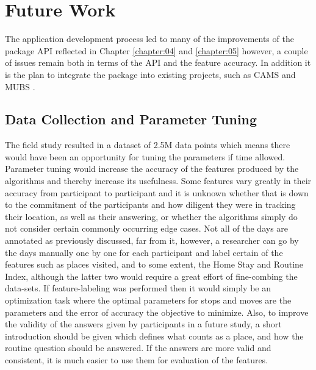 \clearpage
\section{Future Work}
The application development process led to many of the improvements of the package API reflected in Chapter \ref{chapter:04} and \ref{chapter:05} however, a couple of issues remain both in terms of the API and the feature accuracy. In addition it is the plan to integrate the package into existing projects, such as CAMS \cite{CAMS} and MUBS \cite{mubs-rohani}.

\subsection{Data Collection and Parameter Tuning}
The field study resulted in a dataset of 2.5M data points which means there would have been an opportunity for tuning the parameters if time allowed. Parameter tuning would increase the accuracy of the features produced by the algorithms and thereby increase its usefulness. Some features vary greatly in their accuracy from participant to participant and it is unknown whether that is down to the commitment of the participants and how diligent they were in tracking their location, as well as their answering, or whether the algorithms simply do not consider certain commonly occurring edge cases. Not all of the days are annotated as previously discussed, far from it, however, a researcher can go by the days manually one by one for each participant and label certain of the features such as places visited, and to some extent, the Home Stay and Routine Index, although the latter two would require a great effort of fine-combing the data-sets. If feature-labeling was performed then it would simply be an optimization task where the optimal parameters for stops and moves are the parameters and the error of accuracy the objective to minimize. Also, to improve the validity of the answers given by participants in a future study, a short introduction should be given which defines what counts as a place, and how the routine question should be answered. If the answers are more valid and consistent, it is much easier to use them for evaluation of the features.


